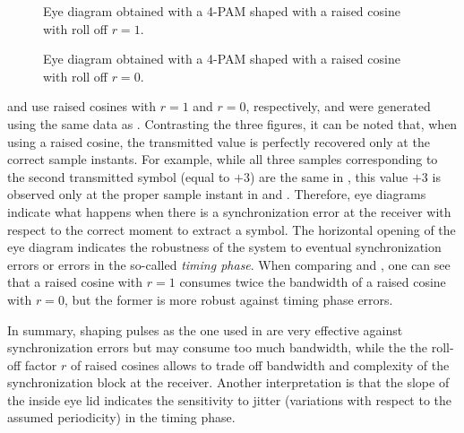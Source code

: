 \begin{figure}[htbp]
\centering
  \caption{Eye diagram obtained with a 4-PAM shaped with a raised cosine with roll off $r=1$.}
  \label{fig:eyeDiagramRcosiner1All}
\end{figure}

\begin{figure}[htbp]
\centering
  \caption{Eye diagram obtained with a 4-PAM shaped with a raised cosine with roll off $r=0$.}
  \label{fig:eyeDiagramRcosiner0All}
\end{figure}

 and  use raised cosines with $r=1$ and $r=0$, respectively, and were generated using the same data as . Contrasting the three figures, it can be noted that, when using a raised cosine, the transmitted value is perfectly recovered only at the correct sample instants. For example, while all three samples corresponding to the second transmitted symbol (equal to $+3$) are the same in , this value $+3$ is observed only at the proper sample instant in  and . 
Therefore, eye diagrams indicate what happens when there is a synchronization error at the receiver with respect to the correct moment to extract a symbol. The horizontal opening of the eye diagram indicates the robustness of the system to eventual synchronization errors or errors in the so-called \emph{timing phase}. When comparing  and , one can see that a raised cosine with $r=1$ consumes twice the bandwidth of a raised cosine with $r=0$, but the former is more robust against timing phase errors.

In summary, shaping pulses as the one used in  are very effective against synchronization errors but may consume too much bandwidth, while the the roll-off factor $r$ of raised cosines allows to trade off bandwidth and complexity of the synchronization block at the receiver. Another interpretation is that the slope of the inside eye lid indicates the sensitivity to jitter (variations with respect to the assumed periodicity) in the timing phase.

